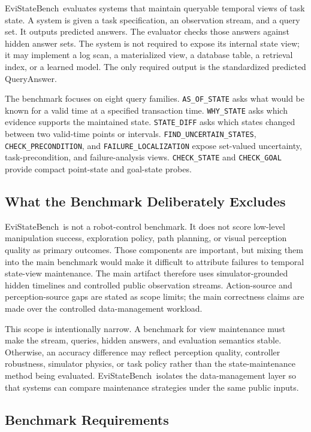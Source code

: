 \documentclass[conference]{IEEEtran}
\newcommand{\bench}{EviStateBench}
\begin{document}
\bench\ evaluates systems that maintain queryable temporal views of task state. A system is given a task specification, an observation stream, and a query set. It outputs predicted answers. The evaluator checks those answers against hidden answer sets. The system is not required to expose its internal state view; it may implement a log scan, a materialized view, a database table, a retrieval index, or a learned model. The only required output is the standardized predicted QueryAnswer.

The benchmark focuses on eight query families. \texttt{AS\_OF\_STATE} asks what would be known for a valid time at a specified transaction time. \texttt{WHY\_STATE} asks which evidence supports the maintained state. \texttt{STATE\_DIFF} asks which states changed between two valid-time points or intervals. \texttt{FIND\_UNCERTAIN\_STATES}, \texttt{CHECK\_PRECONDITION}, and \texttt{FAILURE\_LOCALIZATION} expose set-valued uncertainty, task-precondition, and failure-analysis views. \texttt{CHECK\_STATE} and \texttt{CHECK\_GOAL} provide compact point-state and goal-state probes.

\subsection{What the Benchmark Deliberately Excludes}

\bench\ is not a robot-control benchmark. It does not score low-level manipulation success, exploration policy, path planning, or visual perception quality as primary outcomes. Those components are important, but mixing them into the main benchmark would make it difficult to attribute failures to temporal state-view maintenance. The main artifact therefore uses simulator-grounded hidden timelines and controlled public observation streams. Action-source and perception-source gaps are stated as scope limits; the main correctness claims are made over the controlled data-management workload.

This scope is intentionally narrow. A benchmark for view maintenance must make the stream, queries, hidden answers, and evaluation semantics stable. Otherwise, an accuracy difference may reflect perception quality, controller robustness, simulator physics, or task policy rather than the state-maintenance method being evaluated. \bench\ isolates the data-management layer so that systems can compare maintenance strategies under the same public inputs.

\subsection{Benchmark Requirements}
\end{document}
